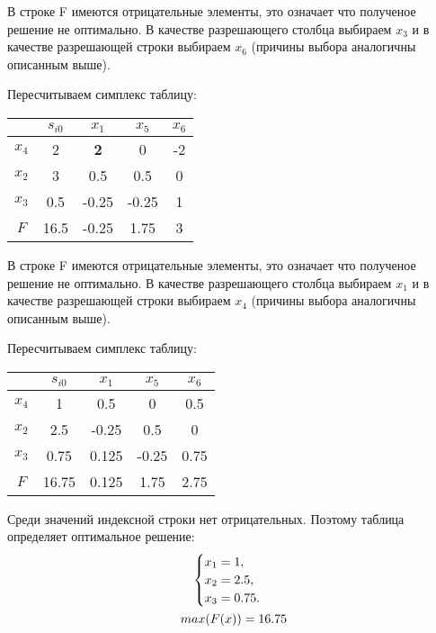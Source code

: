 \documentclass[12pt,a4paper,oneside]{extarticle}
\begin{document}
    В строке F имеются отрицательные элементы, это означает что полученое решение не оптимально.
    В качестве разрешающего столбца выбираем $x_3$ и в качестве разрешающей строки выбираем $x_6$ (причины выбора аналогичны описанным выше).

    Пересчитываем симплекс таблицу:
    \begin{center}
        \begin{tabular}{|c|c|c|c|c|}
            \hline
                 & $s_{i0}$ & $x_1$ & $x_5$ & $x_6$ \\ \hline
            $x_4$ & 2       &{\bf 2} & 0     & -2 \\ \hline
            $x_2$ & 3       & 0.5   & 0.5   & 0  \\ \hline
            $x_3$ & 0.5     & -0.25 & -0.25 & 1 \\ \hline
            $F$   & 16.5    & -0.25 & 1.75  & 3  \\ \hline
        \end{tabular}
    \end{center}

    В строке F имеются отрицательные элементы, это означает что полученое решение не оптимально.
    В качестве разрешающего столбца выбираем $x_1$ и в качестве разрешающей строки выбираем $x_4$ (причины выбора аналогичны описанным выше).

    Пересчитываем симплекс таблицу:
    \begin{center}
        \begin{tabular}{|c|c|c|c|c|}
            \hline
                 & $s_{i0}$ & $x_1$   & $x_5$   & $x_6$ \\ \hline
            $x_4$ & 1       & 0.5     & 0       & 0.5     \\ \hline
            $x_2$ & 2.5     & -0.25   & 0.5     & 0     \\ \hline
            $x_3$ & 0.75    & 0.125   & -0.25   & 0.75  \\ \hline
            $F$   & 16.75   & 0.125   & 1.75    & 2.75  \\ \hline
        \end{tabular}
    \end{center}

    Среди значений индексной строки нет отрицательных. Поэтому таблица определяет оптимальное решение:   
    \begin{gather}
        \begin{cases}
            x_1 = 1,\\
            x_2 = 2.5, \\
            x_3 = 0.75. \\
        \end{cases} \notag \\
        max (F(x)) = 16.75 \notag 
    \end{gather}
\end{document}
